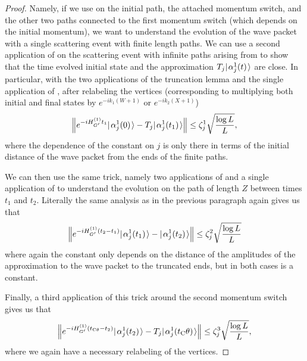 \documentclass[../thesis-main/thesis-main]{subfiles}
\begin{document}
\begin{proof}
Namely, if we use  on the initial path, the attached momentum switch, and the other two paths connected to the first momentum switch (which depends on the initial momentum), we want to understand the evolution of the wave packet with a single scattering event with finite length paths.  We can use a second application of  on the scattering event with infinite paths arising from  to show that the time evolved initial state and the approximation $T_j |\mspace{2mu} \alpha_j^1(t) \mspace{2mu} \rangle$ are close.  In particular, with the two applications of the truncation lemma and the single application of , after relabeling the vertices (corresponding to multiplying both initial and final states by $e^{-i k_1 (W+1)}$ or $e^{- i k_2 (X+1)}$)
\begin{align}
  \Big\Vert e^{-i H_{G'}^{(1)} t_1 } |\mspace{2mu} \alpha_j^{1}(0) \mspace{2mu} \rangle - T_j |\mspace{2mu} \alpha_j^{1}(t_1) \mspace{2mu} \rangle \Big\Vert \leq \zeta_j^1\sqrt{\frac{\log L}{L}},
  \label{eq:two_particle_gadget_single_bound_1}
\end{align}
where the dependence of the constant on $j$ is only there in terms of the initial distance of the wave packet from the ends of the finite paths.  

We can then use the same trick, namely two applications of  and a single application of  to understand the evolution on the path of length $Z$ between times $t_1$ and $t_2$.  Literally the same analysis as in the previous paragraph again gives us that
\begin{align}
  \Big\Vert e^{-i H_{G'}^{(1)} (t_2- t_1) } |\mspace{2mu} \alpha_j^{1}(t_1) \mspace{2mu} \rangle - |\mspace{2mu} \alpha_j^{1}(t_2) \mspace{2mu} \rangle \Big\Vert \leq \zeta_j^2\sqrt{\frac{\log L}{L}}
  \label{eq:two_particle_gadget_single_bound_2}
\end{align}
where again the constant only depends on the distance of the amplitudes of the approximation to the wave packet to the truncated ends, but in both cases is a constant.

Finally, a third application of this trick around the second momentum switch gives us that
\begin{align}
   \Big\Vert e^{-i H_{G'}^{(1)} (t_{\mathrm{C}\theta}- t_2) } |\mspace{2mu} \alpha_j^{1}(t_2) \mspace{2mu} \rangle - T_j |\mspace{2mu} \alpha_j^{1}(t_\mathrm{C}\theta) \mspace{2mu} \rangle \Big\Vert \leq \zeta_j^3\sqrt{\frac{\log L}{L}},
     \label{eq:two_particle_gadget_single_bound_3}
\end{align}
where we again have a necessary relabeling of the vertices.


\end{proof}
\end{document}
